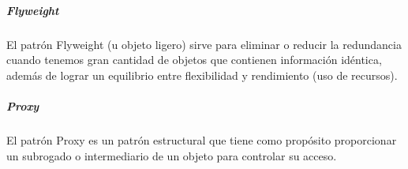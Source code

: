 \vspace*{\fill}
\noindent{}
\subparagraph{Flyweight}
El patrón Flyweight (u objeto ligero) sirve para eliminar o reducir la redundancia cuando tenemos gran cantidad de objetos que contienen información idéntica, además de lograr un equilibrio entre flexibilidad y rendimiento (uso de recursos).\\
\vspace*{\fill}
\noindent{}
\subparagraph{Proxy}
El patrón Proxy es un patrón estructural que tiene como propósito proporcionar un subrogado o intermediario de un objeto para controlar su acceso.\\
\vspace*{\fill}
\noindent{}
